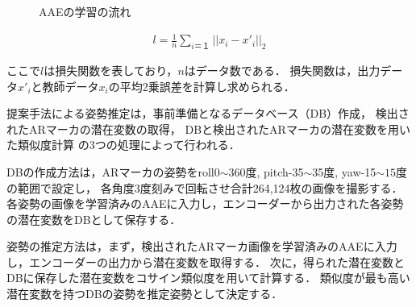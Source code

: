 \documentclass{jsarticle}
\begin{document}
\begin{figure}[ht]
\vspace{0zh}
\setlength{\epsfxsize}{7.5cm}
\centerline{}
\vspace{0zh}
\caption{AAEの学習の流れ}
\label{BB}
\vspace{-3zh}
\end{figure}




\begin{eqnarray}
\label{sonsitu}
l=\frac{1}{n}\sum_{i＝１} ||x_i-x'_i||_2
\end{eqnarray}

ここで$l$は損失関数を表しており，$n$はデータ数である．
損失関数は，出力データ$x'_i$と教師データ$x_i$の平均2乗誤差を計算し求められる．




提案手法による姿勢推定は，事前準備となるデータベース（DB）作成，
検出されたARマーカの潜在変数の取得，
DBと検出されたARマーカの潜在変数を用いた類似度計算
の3つの処理によって行われる．

DBの作成方法は，ARマーカの姿勢をroll0$\sim$360度, pitch-35$\sim$35度, yaw-15$\sim15$度の範囲で設定し，
各角度3度刻みで回転させ合計264,124枚の画像を撮影する．
各姿勢の画像を学習済みのAAEに入力し，エンコーダーから出力された各姿勢の潜在変数をDBとして保存する．

姿勢の推定方法は，まず，検出されたARマーカ画像を学習済みのAAEに入力し，エンコーダーの出力から潜在変数を取得する．
次に，得られた潜在変数とDBに保存した潜在変数をコサイン類似度を用いて計算する．
類似度が最も高い潜在変数を持つDBの姿勢を推定姿勢として決定する．






\end{document}
